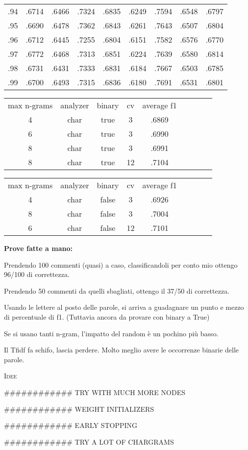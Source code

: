 \documentclass[a4paper,10pt]{article} %
\newcommand{\msection}[1]{%
    {\newpage\bigbreak \bigbreak \par \hfil \huge \textsc {#1}}\par}
\renewcommand{\b}[1]{%
    {\textbf{#1}}}
\begin{document}
\begin{tabular} {ccccccccc}
    .94  & .6714 & .6466 & .7324 & .6835 & .6249 & .7594 & .6548 & .6797  \\
    .95  & .6690 & .6478 & .7362 & .6843 & .6261 & .7643 & .6507 & .6804  \\
    .96  & .6712 & .6445 & .7255 & .6804 & .6151 & .7582 & .6576 & .6770  \\
    .97  & .6772 & .6468 & .7313 & .6851 & .6224 & .7639 & .6580 & .6814  \\
    .98  & .6731 & .6431 & .7333 & .6831 & .6184 & .7667 & .6503 & .6785  \\
    .99  & .6700 & .6493 & .7315 & .6836 & .6180 & .7691 & .6531 & .6801  \\
\end{tabular} 

\begin{tabular} {ccccccccc}
max n-grams & analyzer & binary & cv & average f1 \\
    4       &  char    & true  & 3  & .6869 \\
    6       &  char    & true  & 3  & .6990 \\
    8       &  char    & true  & 3  & .6991 \\
    8       &  char    & true  & 12  & .7104 \\
\end{tabular} 

\begin{tabular} {ccccccccc}
max n-grams & analyzer & binary & cv & average f1 \\
    4       &  char    & false  & 3  & .6926 \\
    8       &  char    & false  & 3  & .7004 \\
    6       &  char    & false  & 12  & .7101 \\
\end{tabular} 

\b{Prove fatte a mano:}

Prendendo 100 commenti (quasi) a caso, classificandoli per conto mio ottengo 96/100 di correttezza.

Prendendo 50 commenti da quelli sbagliati, ottengo il 37/50 di correttezza.

Usando le lettere al posto delle parole, si arriva a guadagnare un punto e mezzo di percentuale di f1. (Tuttavia ancora da provare con binary a True)

Se si usano tanti n-gram, l'impatto del random è un pochino più basso.

Il Tfidf fa schifo, lascia perdere. Molto meglio avere le occorrenze binarie delle parole.


\msection{Idee }
############ TRY WITH MUCH MORE NODES

############ WEIGHT INITIALIZERS

############ EARLY STOPPING

############ TRY A LOT OF CHARGRAMS
\end{document}
